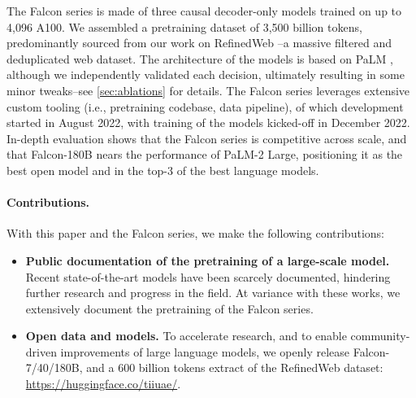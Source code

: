 \documentclass{article}
\begin{document}
The Falcon series is made of three causal decoder-only models trained on up to 4,096 A100. We assembled a pretraining dataset of 3,500 billion tokens, predominantly sourced from our work on RefinedWeb \citep{refinedweb}--a massive filtered and deduplicated web dataset. The architecture of the models is based on PaLM \citep{palm}, although we independently validated each decision, ultimately resulting in some minor tweaks--see \cref{sec:ablations} for details. The Falcon series leverages extensive custom tooling (i.e., pretraining codebase, data pipeline), of which development started in August 2022, with training of the models kicked-off in December 2022. In-depth evaluation shows that the Falcon series is competitive across scale, and that Falcon-180B nears the performance of PaLM-2 Large, positioning it as the best open model and in the top-3 of the best language models.

\paragraph{Contributions.} With this paper and the Falcon series, we make the following contributions:
\vspace{-0.1in}
\begin{itemize}
    \item \textbf{Public documentation of the pretraining of a large-scale model.} Recent state-of-the-art models have been scarcely documented, hindering further research and progress in the field. At variance with these works, we extensively document the pretraining of the Falcon series.
    \item \textbf{Open data and models.} To accelerate research, and to enable community-driven improvements of large language models, we openly release Falcon-7/40/180B, and a 600 billion tokens extract of the RefinedWeb dataset: \url{https://huggingface.co/tiiuae/}.
\end{itemize}
\end{document}
